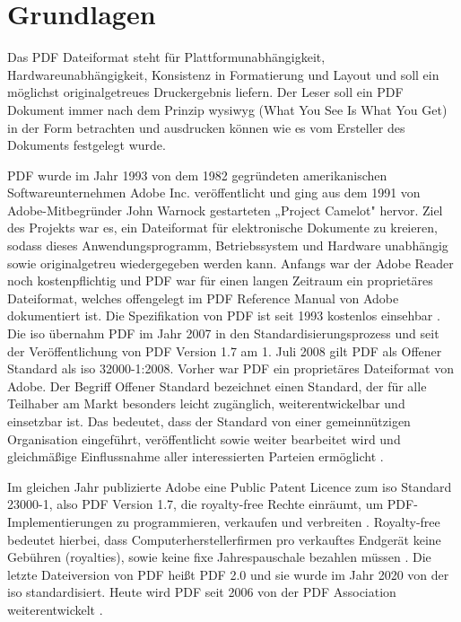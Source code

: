 \chapter{Grundlagen}
Das PDF Dateiformat steht für Plattformunabhängigkeit, Hardwareunabhängigkeit, Konsistenz in Formatierung und Layout und soll ein möglichst originalgetreues Druckergebnis liefern. Der Leser soll ein PDF Dokument immer nach dem Prinzip \gls{wysiwyg} (What You See Is What You Get) in der Form betrachten und ausdrucken können wie es vom Ersteller des Dokuments festgelegt wurde.
\par
PDF wurde im Jahr 1993 von dem 1982 gegründeten amerikanischen Softwareunternehmen Adobe Inc. veröffentlicht und ging aus dem 1991 von Adobe-Mitbegründer John Warnock gestarteten „Project Camelot" hervor\cite{wiki-pdf-de}. Ziel des Projekts war es, ein Dateiformat für elektronische Dokumente zu kreieren, sodass dieses Anwendungsprogramm, Betriebssystem und Hardware unabhängig sowie originalgetreu wiedergegeben werden kann. Anfangs war der Adobe Reader noch kostenpflichtig und PDF war für einen langen Zeitraum ein proprietäres Dateiformat, welches offengelegt im PDF Reference Manual von Adobe dokumentiert ist. Die Spezifikation von PDF ist seit 1993 kostenlos einsehbar \cite{wiki-pdf-engl}. Die \gls{iso} übernahm PDF im Jahr 2007 in den Standardisierungsprozess und seit der Veröffentlichung von PDF Version 1.7 am 1. Juli 2008 gilt PDF als Offener Standard als \gls{iso} 32000-1:2008\cite{wiki-pdf-de, wiki-pdf-engl}. Vorher war PDF ein proprietäres Dateiformat von Adobe. Der Begriff Offener Standard bezeichnet einen Standard, der für alle Teilhaber am Markt besonders leicht zugänglich, weiterentwickelbar und einsetzbar ist. Das bedeutet, dass der Standard von einer gemeinnützigen Organisation eingeführt, veröffentlicht sowie weiter bearbeitet wird und gleichmäßige Einflussnahme aller interessierten Parteien ermöglicht \cite{wiki-standard}.
\par
Im gleichen Jahr publizierte Adobe eine Public Patent Licence zum \gls{iso} Standard 23000-1, also PDF Version 1.7, die royalty-free Rechte einräumt, um PDF-Implementierungen zu programmieren, verkaufen und verbreiten \cite{wiki-pdf-engl}. Royalty-free bedeutet hierbei, dass Computerherstellerfirmen pro verkauftes Endgerät keine Gebühren (royalties), sowie keine fixe Jahrespauschale bezahlen müssen \cite{wiki-roy-free}. Die letzte Dateiversion von PDF heißt PDF 2.0 und sie wurde im Jahr 2020 von der \gls{iso} standardisiert. Heute wird PDF seit 2006 von der PDF Association weiterentwickelt \cite{wiki-pdf-de}. 









